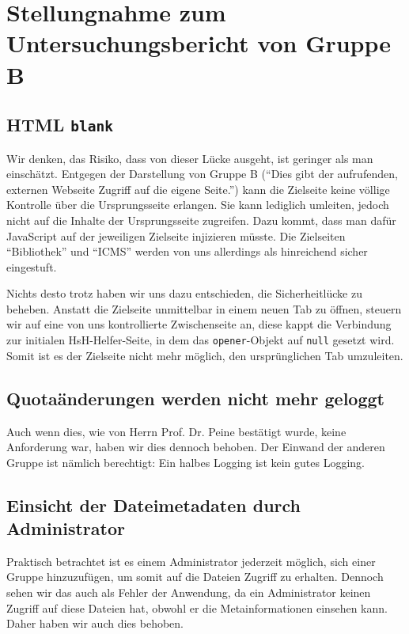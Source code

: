 \documentclass[12pt,DIV14,BCOR10mm,a4paper,parskip=half-,headsepline,headinclude,english,ngerman,bibliography=totocnumbered]{scrreprt}
\begin{document}
\vspace*{-3cm}

\tableofcontents  %

\chapter{Stellungnahme zum Untersuchungsbericht von Gruppe B}

\section{HTML \texttt{blank}}

Wir denken, das Risiko, dass von dieser Lücke ausgeht, ist geringer als man einschätzt.
Entgegen der Darstellung von Gruppe B (\enquote{Dies gibt der aufrufenden, externen Webseite Zugriff auf die eigene Seite.}) kann die Zielseite keine völlige Kontrolle über die Ursprungsseite erlangen.
Sie kann lediglich umleiten, jedoch nicht auf die Inhalte der Ursprungsseite zugreifen.
Dazu kommt, dass man dafür JavaScript auf der jeweiligen Zielseite injizieren müsste.
Die Zielseiten \enquote{Bibliothek} und \enquote{ICMS} werden von uns allerdings als hinreichend sicher eingestuft.

Nichts desto trotz haben wir uns dazu entschieden, die Sicherheitlücke zu beheben.
Anstatt die Zielseite unmittelbar in einem neuen Tab zu öffnen, steuern wir auf eine von uns kontrollierte Zwischenseite an, diese kappt die Verbindung zur initialen HsH-Helfer-Seite, in dem das \texttt{opener}-Objekt auf \texttt{null} gesetzt wird.
Somit ist es der Zielseite nicht mehr möglich, den ursprünglichen Tab umzuleiten.

\section{Quotaänderungen werden nicht mehr geloggt}

Auch wenn dies, wie von Herrn Prof. Dr. Peine bestätigt wurde, keine Anforderung war, haben wir dies dennoch behoben.
Der Einwand der anderen Gruppe ist nämlich berechtigt: Ein halbes Logging ist kein gutes Logging.

\section{Einsicht der Dateimetadaten durch Administrator}

Praktisch betrachtet ist es einem Administrator jederzeit möglich, sich einer Gruppe hinzuzufügen, um somit auf die Dateien Zugriff zu erhalten.
Dennoch sehen wir das auch als Fehler der Anwendung, da ein Administrator keinen Zugriff auf diese Dateien hat, obwohl er die Metainformationen einsehen kann.
Daher haben wir auch dies behoben.
\end{document}
